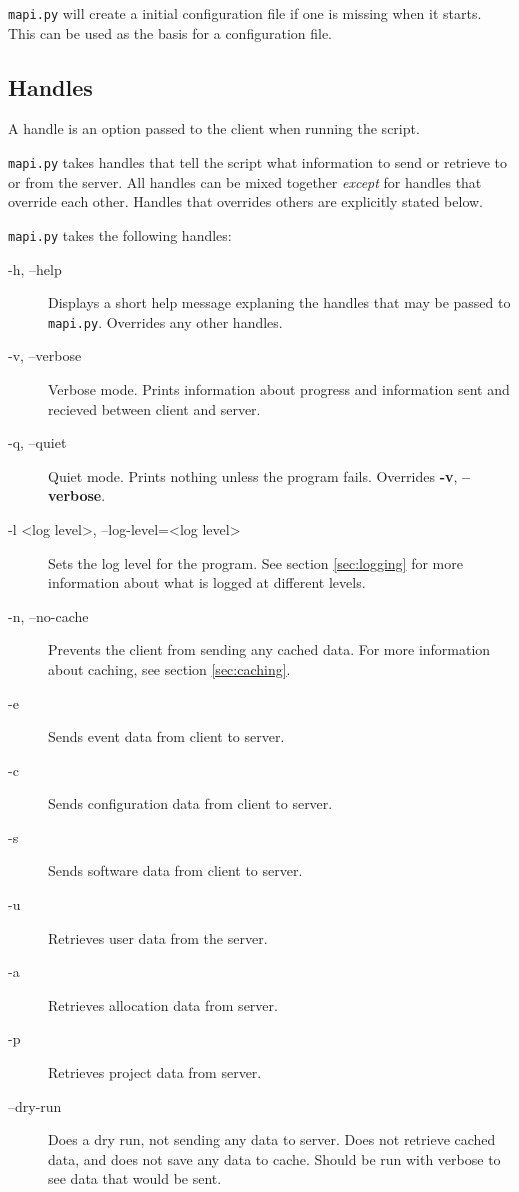 \texttt{mapi.py} will create a initial configuration file if one is missing
when it starts. This can be used as the basis for a configuration file. 


\subsection{Handles}
\label{sec:handles}
A handle is an option passed to the client when running the script.

\texttt{mapi.py} takes handles that tell the script what information to send
or retrieve to or from the server. All handles can be mixed together
\textit{except} for handles that override each other. Handles that overrides
others are explicitly stated below.

\texttt{mapi.py} takes the following handles:

\begin{description}
    \item[-h, --help]   Displays a short help message explaning the handles
    that may be passed to \texttt{mapi.py}. Overrides any other handles.
    \item[-v, --verbose]    Verbose mode. Prints information about progress and
    information sent and recieved between client and server. 
    \item[-q, --quiet]  Quiet mode. Prints nothing unless the program fails.
    Overrides \textbf{-v}, \textbf{--verbose}.
    \item[-l \textless log level\textgreater, --log-level=\textless log
    level\textgreater] Sets the log level for the program. See section 
    \ref{sec:logging} for more information about what is logged at different 
    levels.
    \item[-n, --no-cache]   Prevents the client from sending any cached data.
    For more information about caching, see section \ref{sec:caching}.
    \item[-e]   Sends event data from client to server.
    \item[-c]   Sends configuration data from client to server.
    \item[-s]   Sends software data from client to server.
    \item[-u]   Retrieves user data from the server.
    \item[-a]   Retrieves allocation data from server.
    \item[-p]   Retrieves project data from server.
    \item[--dry-run]    Does a dry run, not sending any data to server. Does
        not retrieve cached data, and does not save any data to cache.
        Should be run with verbose to see data that would be sent.
\end{description}

